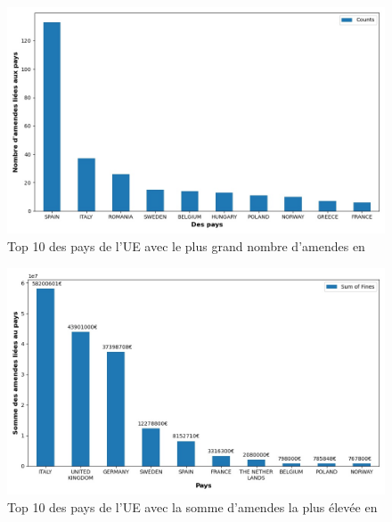 \documentclass[french]{article}
\begin{document}
	\begin{figure}
		[H]\centering\includegraphics[scale=.5]{graphs/top10_countries_year}
		\caption{Top 10 des pays de l'UE avec le plus grand nombre d'amendes en }
	\end{figure}
	\begin{figure}
		[H]\centering\includegraphics[scale=.5]{graphs/top10_countries_year_fines}
		\caption{Top 10 des pays de l'UE avec la somme d'amendes la plus élevée en }
	\end{figure}
\end{document}
